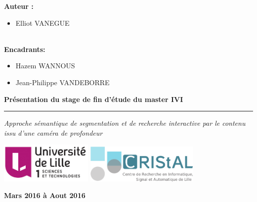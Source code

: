 \documentclass[a4paper,11pt]{article}
\begin{document}

\vspace{1cm}

\begin{multicols}{2}  

    \textbf{\large Auteur : }
    \begin{itemize}
      \item Elliot VANEGUE
    \end{itemize}
    \ \\
    
    \textbf{\large Encadrants:}
    \begin{itemize}
      \item Hazem WANNOUS
      \item Jean-Philippe VANDEBORRE 
    \end{itemize}

\end{multicols}

\vspace{4cm}

 \begin{flushright}
  \begin{spacing}{1.6}
    \textbf{
      {\LARGE Présentation du stage de fin d'étude du master IVI}
    }
  \end{spacing}
  \hrule
  \vspace{0.2cm}
  \textit{
    {\Large\textcolor{mygray}{Approche sémantique de segmentation et de recherche interactive par le contenu issu d’une caméra de profondeur}}
  }
\end{flushright}

\vspace{3.5cm}

\begin{center}
  \includegraphics[width=4.5cm]{image/logoLILLE1.png}
  \hspace{1.5cm}
  \includegraphics[width=5.5cm]{image/logoCRIStAL.png}
  \vspace{3.5cm}


  {\large\textbf{Mars 2016 à Aout 2016}}
\end{center}
\end{document}
